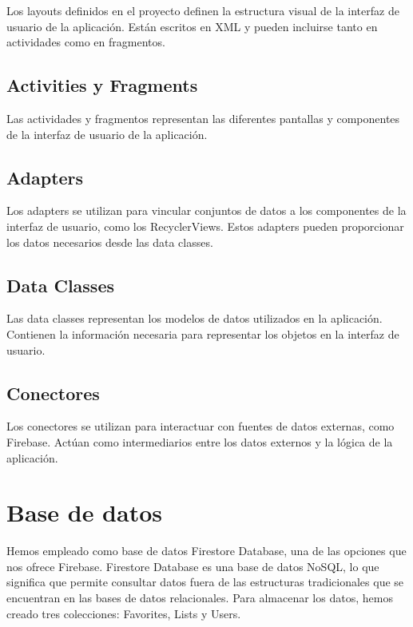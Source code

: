 \documentclass{article}
\begin{document}
    Los layouts definidos en el proyecto definen la estructura visual de la interfaz de usuario de la aplicación. Están escritos en XML y pueden incluirse tanto en actividades como en fragmentos.

    \subsection{Activities y Fragments}

    Las actividades y fragmentos representan las diferentes pantallas y componentes de la interfaz de usuario de la aplicación.

    \subsection{Adapters}

    Los adapters se utilizan para vincular conjuntos de datos a los componentes de la interfaz de usuario, como los RecyclerViews. Estos adapters pueden proporcionar los datos necesarios desde las data classes.

    \subsection{Data Classes}

    Las data classes representan los modelos de datos utilizados en la aplicación. Contienen la información necesaria para representar los objetos en la interfaz de usuario.

    \subsection{Conectores}

    Los conectores se utilizan para interactuar con fuentes de datos externas, como Firebase. Actúan como intermediarios entre los datos externos y la lógica de la aplicación.

\section{Base de datos}

    Hemos empleado como base de datos Firestore Database, una de las opciones que nos ofrece Firebase. Firestore Database es una base de datos NoSQL, lo que significa que permite consultar datos fuera de las estructuras tradicionales que se encuentran en las bases de datos relacionales. Para almacenar los datos, hemos creado tres colecciones: Favorites, Lists y Users.
    
\end{document}
